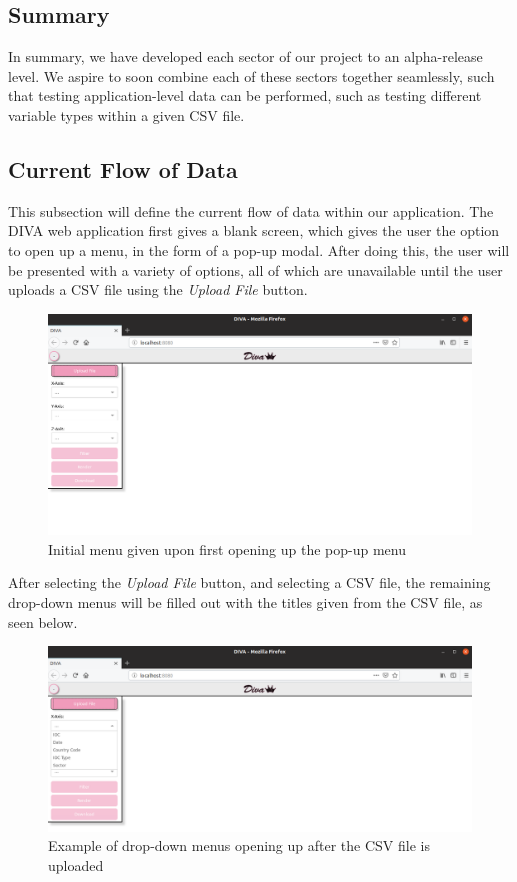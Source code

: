 \documentclass[journal,10pt,onecolumn,compsoc]{IEEEtran} \usepackage[margin=1.0in]{geometry} \usepackage{pdfpages}
\begin{document}
 \subsection{Summary}
 In summary, we have developed each sector of our project to an alpha-release level. We aspire to soon combine each of these sectors together seamlessly, such that testing application-level data can be performed, such as testing different variable types within a given CSV file. 
 
 \subsection{Current Flow of Data}
 This subsection will define the current flow of data within our application.\newline
 \newline
 The DIVA web application first gives a blank screen, which gives the user the option to open up a menu, in the form of a pop-up modal. After doing this, the user will be presented with a variety of options, all of which are unavailable until the user uploads a CSV file using the \emph{Upload File} button. 
    
     \begin{figure}[H]
        \centering
        \includegraphics[width=\linewidth]{menu1.png}
        \caption{Initial menu given upon first opening up the pop-up menu}
    \end{figure}
 
 \newpage
 After selecting the \emph{Upload File} button, and selecting a CSV file, the remaining drop-down menus will be filled out with the titles given from the CSV file, as seen below.

     \begin{figure}[H]
        \centering
        \includegraphics[width=\linewidth]{menu2.png}
        \caption{Example of drop-down menus opening up after the CSV file is uploaded}
    \end{figure}
 
\end{document}
